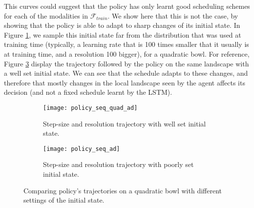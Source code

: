 {		
		This curves could suggest that the policy has only learnt good scheduling schemes for each of the modalities in $\mathcal{F}_{train}$. We show here that this is not the case, by showing that the policy is able to adapt to sharp changes of its initial state. In Figure \ref{fig::policy_seq_ad}, we sample this initial state far from the distribution that was used at training time (typically, a learning rate that is 100 times smaller that it usually is at training time, and a resolution 100 bigger), for a quadratic bowl. For reference, Figure \ref{fig::policy_seq_quad_ad} display the trajectory followed by the policy on the same landscape with a well set initial state. We can see that the schedule adapts to these changes, and therefore that mostly changes in the local landscape seen by the agent affects its decision (and not a fixed schedule learnt by the LSTM). 
		
		
		\begin{figure}[h!]
		\centering
			\begin{subfigure}[b]{0.45\linewidth}
			{
				\centering
				\texttt{[image: policy\_seq\_quad\_ad]}
				\caption{Step-size and resolution trajectory with well set initial state.}
				\label{fig::policy_seq_ad}
			}
			\end{subfigure}
			\begin{subfigure}[b]{0.45\linewidth}
			{
				\centering
				\texttt{[image: policy\_seq\_ad]}
				\caption{Step-size and resolution trajectory with poorly set initial state.}	
				\label{fig::policy_seq_quad_ad}
			}
			\end{subfigure}
			\caption[Some policy trajectories]{Comparing policy's trajectories on a quadratic bowl with different settings of the initial state.}
		\end{figure}
	}
